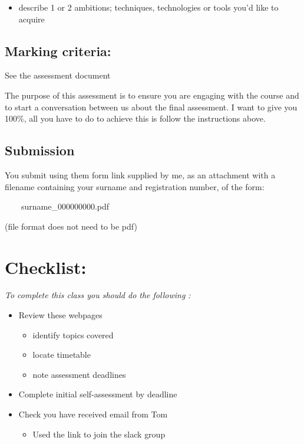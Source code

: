 \documentclass[
]{book}
\providecommand{\tightlist}{%
  \setlength{\itemsep}{0pt}\setlength{\parskip}{0pt}}
\begin{document}
\begin{itemize}
\tightlist
\item
  describe 1 or 2 ambitions; techniques, technologies or tools you'd like to acquire
\end{itemize}

\hypertarget{marking-criteria}{%
\subsection{Marking criteria:}\label{marking-criteria}}

See the assessment document

The purpose of this assessment is to ensure you are engaging with the course and to start a conversation between us about the final assessment. I want to give you 100\%, all you have to do to achieve this is follow the instructions above.

\hypertarget{submission}{%
\subsection{Submission}\label{submission}}

You submit using them form link supplied by me, as an attachment with a filename containing your surname and registration number, of the form:

~~~~surname\_000000000.pdf

(file format does not need to be pdf)

\hypertarget{checklist}{%
\section{Checklist:}\label{checklist}}

\emph{To complete this class you should do the following :}

\begin{itemize}
\item
  Review these webpages

  \begin{itemize}
  \tightlist
  \item
    identify topics covered
  \item
    locate timetable
  \item
    note assessment deadlines
  \end{itemize}
\item
  Complete initial self-assessment by deadline
\item
  Check you have received email from Tom

  \begin{itemize}
  \tightlist
  \item
    Used the link to join the slack group
  \end{itemize}
\end{itemize}
\end{document}
